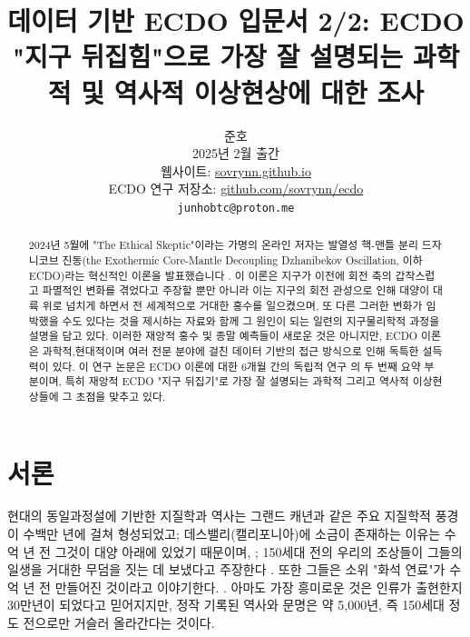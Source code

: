 \documentclass[10pt,twocolumn,letterpaper]{article}
\begin{document}
\title{데이터 기반 ECDO 입문서 2/2: ECDO "지구 뒤집힘"으로 가장 잘 설명되는 과학적 및 역사적 이상현상에 대한 조사}

\author{준호\\
2025년 2월 출간\\
웹사이트: \href{https://sovrynn.github.io}{sovrynn.github.io}\\
ECDO 연구 저장소: \href{https://github.com/sovrynn/ecdo}{github.com/sovrynn/ecdo}\\
{\tt\small junhobtc@proton.me}
}

\maketitle

\begin{abstract}
2024년 5월에 "The Ethical Skeptic"이라는 가명의 온라인 저자는 발열성 핵-맨틀 분리 드자니코브 진동(the Exothermic Core-Mantle Decoupling Dzhanibekov Oscillation, 이하 ECDO)라는 혁신적인 이론을 발표했습니다 \cite{0} \cite{1}. 이 이론은 지구가 이전에 회전 축의 갑작스럽고 파멸적인 변화를 겪었다고 주장할 뿐만 아니라 이는 지구의 회전 관성으로 인해 대양이 대륙 위로 넘치게 하면서 전 세계적으로 거대한  홍수를 일으켰으며, 또 다른 그러한 변화가 임박했을 수도 있다는 것을 제시하는 자료와 함께 그 원인이 되는 일련의 지구물리학적 과정을 설명을 담고 있다. 이러한 재앙적 홍수 및 종말 예측들이 새로운 것은 아니지만, ECDO 이론은 과학적,현대적이며 여러 전문 분야에 걸친 데이터 기반의 접근 방식으로 인해 독특한 설득력이 있다. 
이 연구 논문은 ECDO 이론에 대한 6개월 간의 독립적 연구 \cite{2,20}의 두 번째 요약 부분이며, 특히 재앙적 ECDO "지구 뒤집기"로 가장 잘 설명되는 과학적 그리고 역사적 이상현상들에 그 초점을 맞추고 있다.

\end{abstract}


\section{서론}

현대의 동일과정설에 기반한 지질학과 역사는 그랜드 캐년과 같은 주요 지질학적 풍경이 수백만 년에 걸쳐 형성되었고\cite{143}; 데스밸리(캘리포니아)에 소금이 존재하는 이유는 수억 년 전 그것이 대양 아래에 있었기 때문이며, \cite{144}; 150세대 전의 우리의 조상들이 그들의 일생을 거대한 무덤을 짓는 데 보냈다고 주장한다 \cite{29,70}. 또한 그들은 소위 "화석 연료"가 수억 년 전 만들어진 것이라고 이야기한다. \cite{104}. 아마도 가장 흥미로운 것은 인류가 출현한지 30만년이 되었다고 믿어지지만\cite{145}, 정작 기록된 역사와 문명은 약 5,000년, 즉 150세대 정도 전으로만 거슬러 올라간다는 것이다.
\end{document}
